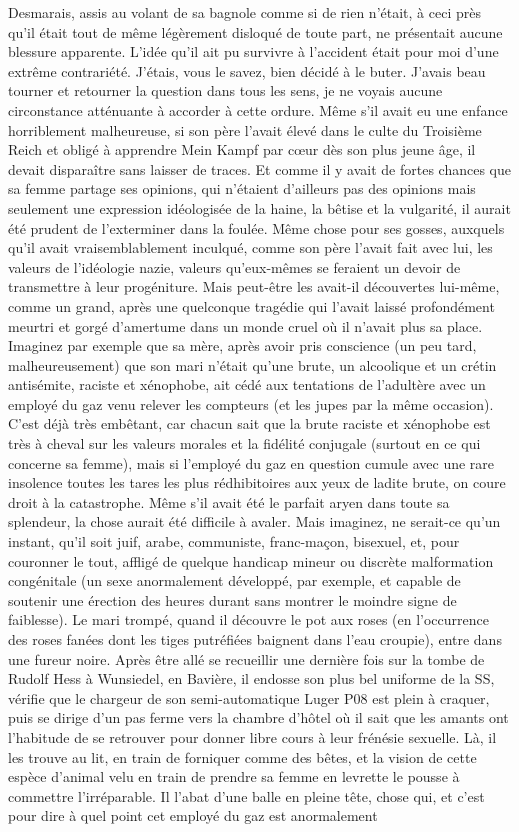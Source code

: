 Desmarais, assis au volant de sa bagnole comme si de rien n’était, à ceci près qu’il était tout de même légèrement disloqué de toute part, ne présentait aucune blessure apparente. L’idée qu’il ait pu survivre à l’accident était pour moi d’une extrême contrariété. J’étais, vous le savez, bien décidé à le buter. J’avais beau tourner et retourner la question dans tous les sens, je ne voyais aucune circonstance atténuante à accorder à cette ordure. Même s’il avait eu une enfance horriblement malheureuse, si son père l’avait élevé dans le culte du Troisième Reich et obligé à apprendre Mein Kampf par cœur dès son plus jeune âge, il devait disparaître sans laisser de traces. Et comme il y avait de fortes chances que sa femme partage ses opinions, qui n’étaient d’ailleurs pas des opinions mais seulement une expression idéologisée de la haine, la bêtise et la vulgarité, il aurait été prudent de l’exterminer dans la foulée. Même chose pour ses gosses, auxquels qu’il avait vraisemblablement inculqué, comme son père l’avait fait avec lui, les valeurs de l’idéologie nazie, valeurs qu’eux-mêmes se feraient un devoir de transmettre à leur progéniture. Mais peut-être les avait-il découvertes lui-même, comme un grand, après une quelconque tragédie qui l’avait laissé profondément meurtri et gorgé d’amertume dans un monde cruel où il n’avait plus sa place. Imaginez par exemple que sa mère, après avoir pris conscience (un peu tard, malheureusement) que son mari n’était qu’une brute, un alcoolique et un crétin antisémite, raciste et xénophobe, ait cédé aux tentations de l’adultère avec un employé du gaz venu relever les compteurs (et les jupes par la même occasion). C’est déjà très embêtant, car chacun sait que la brute raciste et xénophobe est très à cheval sur les valeurs morales et la fidélité conjugale (surtout en ce qui concerne sa femme), mais si l’employé du gaz en question cumule avec une rare insolence toutes les tares les plus rédhibitoires aux yeux de ladite brute, on coure droit à la catastrophe. Même s’il avait été le parfait aryen dans toute sa splendeur, la chose aurait été difficile à avaler. Mais imaginez, ne serait-ce qu’un instant, qu’il soit juif, arabe, communiste, franc-maçon, bisexuel, et, pour couronner le tout, affligé de quelque handicap mineur ou discrète malformation congénitale (un sexe anormalement développé, par exemple, et capable de soutenir une érection des heures durant sans montrer le moindre signe de faiblesse). Le mari trompé, quand il découvre le pot aux roses (en l’occurrence des roses fanées dont les tiges putréfiées baignent dans l’eau croupie), entre dans une fureur noire. Après être allé se recueillir une dernière fois sur la tombe de Rudolf Hess à Wunsiedel, en Bavière, il endosse son plus bel uniforme de la SS, vérifie que le chargeur de son semi-automatique Luger P08 est plein à craquer, puis se dirige d’un pas ferme vers la chambre d’hôtel où il sait que les amants ont l’habitude de se retrouver pour donner libre cours à leur frénésie sexuelle. Là, il les trouve au lit, en train de forniquer comme des bêtes, et la vision de cette espèce d’animal velu en train de prendre sa femme en levrette le pousse à commettre l’irréparable. Il l’abat d’une balle en pleine tête, chose qui, et c’est pour dire à quel point cet employé du gaz est anormalement 